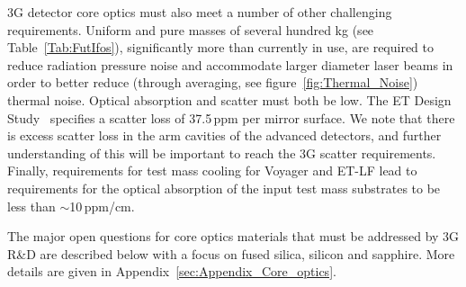 3G detector core optics must also meet a number of other challenging requirements. 
Uniform and pure masses of several hundred kg (see Table~\ref{Tab:FutIfos}), significantly more than currently in use, are required to reduce radiation pressure noise and accommodate larger diameter laser beams in order to better reduce (through averaging, see figure~\ref{fig:Thermal_Noise}) thermal noise. Optical absorption and scatter must both be low. The ET Design Study~\cite{ET2011} specifies a scatter loss of 37.5\,ppm per mirror surface. We note that there is excess scatter loss in the arm cavities of the advanced detectors, and further understanding of this will be important to reach the 3G scatter requirements. Finally, requirements for test mass cooling for Voyager and ET-LF lead to requirements for the optical absorption of the input test mass substrates to be less than $\sim$10\,ppm/cm.

The major open questions for core optics materials that must be addressed by 3G R\&D are described below with a focus on fused silica, silicon and sapphire. More details are given in Appendix~\ref{sec:Appendix_Core_optics}.





